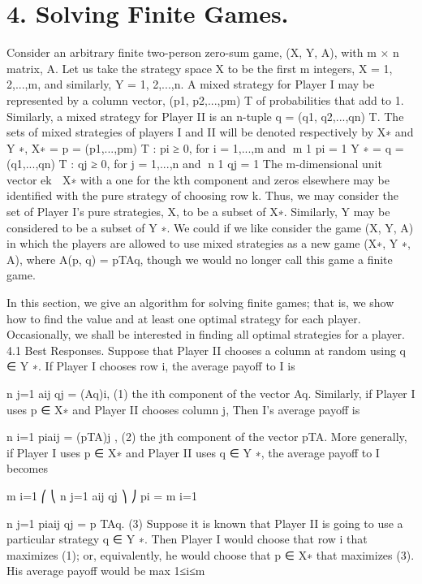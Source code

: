 

\section{4. Solving Finite Games.}
Consider an arbitrary finite two-person zero-sum game, (X, Y, A), with m × n matrix,
A. Let us take the strategy space X to be the first m integers, X = {1, 2,...,m}, and
similarly, Y = {1, 2,...,n}. A mixed strategy for Player I may be represented by a column
vector, (p1, p2,...,pm)
T of probabilities that add to 1. Similarly, a mixed strategy for Player
II is an n-tuple q = (q1, q2,...,qn)
T. The sets of mixed strategies of players I and II will
be denoted respectively by X∗ and Y ∗,
X∗ = {p = (p1,...,pm)
T : pi ≥ 0, for i = 1,...,m and m
1 pi = 1}
Y ∗ = {q = (q1,...,qn)
T : qj ≥ 0, for j = 1,...,n and n
1 qj = 1}
The m-dimensional unit vector ek ∈ X∗ with a one for the kth component and zeros
elsewhere may be identified with the pure strategy of choosing row k. Thus, we may
consider the set of Player I’s pure strategies, X, to be a subset of X∗. Similarly, Y may
be considered to be a subset of Y ∗. We could if we like consider the game (X, Y, A) in
which the players are allowed to use mixed strategies as a new game (X∗, Y ∗, A), where
A(p, q) = pTAq, though we would no longer call this game a finite game.

In this section, we give an algorithm for solving finite games; that is, we show how to
find the value and at least one optimal strategy for each player. Occasionally, we shall be
interested in finding all optimal strategies for a player.
4.1 Best Responses. Suppose that Player II chooses a column at random using
q ∈ Y ∗. If Player I chooses row i, the average payoff to I is

n
j=1
aij qj = (Aq)i, (1)
the ith component of the vector Aq. Similarly, if Player I uses p ∈ X∗ and Player II
chooses column j, Then I’s average payoff is

n
i=1
piaij = (pTA)j , (2)
the jth component of the vector pTA. More generally, if Player I uses p ∈ X∗ and Player
II uses q ∈ Y ∗, the average payoff to I becomes

m
i=1
⎛
⎝
n
j=1
aij qj
⎞
⎠ pi = 
m
i=1

n
j=1
piaij qj = p
TAq. (3)
Suppose it is known that Player II is going to use a particular strategy q ∈ Y ∗. Then
Player I would choose that row i that maximizes (1); or, equivalently, he would choose
that p ∈ X∗ that maximizes (3). His average payoff would be
max
1≤i≤m

